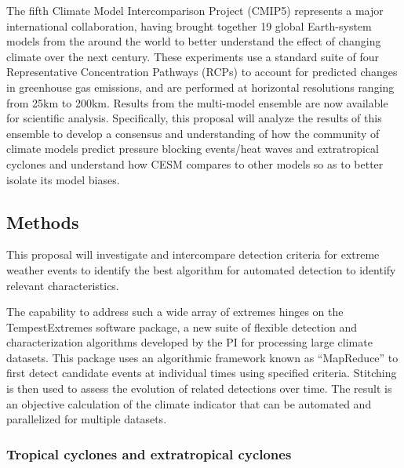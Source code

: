 \documentclass[11pt]{article}
\begin{document}
The fifth Climate Model Intercomparison Project (CMIP5) represents a major international collaboration, having brought together 19 global Earth-system models from the around the world to better understand the effect of changing climate over the next century.  These experiments use a standard suite of four Representative Concentration Pathways (RCPs) to account for predicted changes in greenhouse gas emissions, and are performed at horizontal resolutions ranging from 25km to 200km.  Results from the multi-model ensemble are now available for scientific analysis.  Specifically, this proposal will analyze the results of this ensemble to develop a consensus and understanding of how the community of climate models predict pressure blocking events/heat waves and extratropical cyclones and understand how CESM compares to other models so as to better isolate its model biases.

\subsection{Methods} \label{sec:Methods}

This proposal will investigate and intercompare detection criteria for extreme weather events to identify the best algorithm for automated detection to identify relevant characteristics.

The capability to address such a wide array of extremes hinges on the TempestExtremes software package, a new suite of flexible detection and characterization algorithms developed by the PI for processing large climate datasets. This package uses an algorithmic framework known as ``MapReduce'' to first detect candidate events at individual times using specified criteria. Stitching is then used to assess the evolution of related detections over time. The result is an objective calculation of the climate indicator that can be automated and parallelized for multiple datasets.

\subsubsection{Tropical cyclones and extratropical cyclones}
\end{document}
